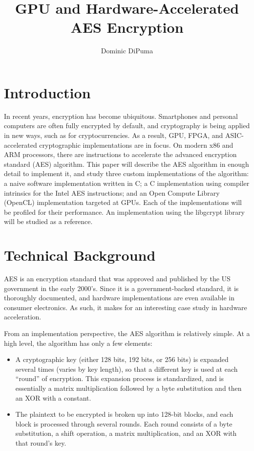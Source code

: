 \documentclass[a4paper,10pt]{article}
\title{GPU and Hardware-Accelerated AES Encryption}
\author{Dominic DiPuma}
\begin{document}
\maketitle

\section{Introduction}

In recent years, encryption has become ubiquitous.  Smartphones and personal computers are often fully encrypted by default, and cryptography is being applied in new ways, such as for cryptocurrencies.  As a result, GPU, FPGA, and ASIC-accelerated cryptographic implementations are in focus.  On modern x86 and ARM processors, there are instructions to accelerate the advanced encryption standard (AES) algorithm.  This paper will describe the AES algorithm in enough detail to implement it, and study three custom implementations of the algorithm: a naive software implementation written in C; a C implementation using compiler intrinsics for the Intel AES instructions; and an Open Compute Library (OpenCL) implementation targeted at GPUs.  Each of the implementations will be profiled for their performance.  An implementation using the libgcrypt library will be studied as a reference.

\section{Technical Background}

AES is an encryption standard that was approved and published by the US government in the early 2000's\cite{nist}.  Since it is a government-backed standard, it is thoroughly documented, and hardware implementations are even available in consumer electronics.  As such, it makes for an interesting case study in hardware acceleration.

From an implementation perspective, the AES algorithm is relatively simple.  At a high level, the algorithm has only a few elements:
\begin{itemize}
 \item A cryptographic key (either 128 bits, 192 bits, or 256 bits) is expanded several times (varies by key length), so that a different key is used at each ``round'' of encryption.  This expansion process is standardized, and is essentially a matrix multiplication followed by a byte substitution and then an XOR with a constant.
 \item The plaintext to be encrypted is broken up into 128-bit blocks, and each block is processed through several rounds.  Each round consists of a byte substitution, a shift operation, a matrix multiplication, and an XOR with that round's key.
\end{itemize}
\end{document}
